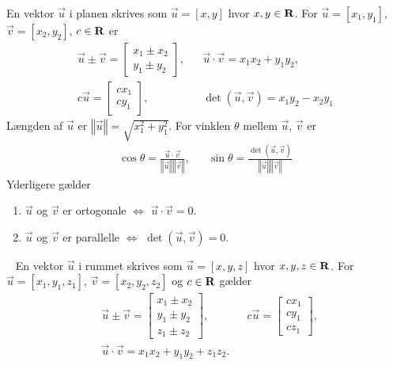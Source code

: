 En vektor $\vec{u}$ i planen skrives som $\vec{u}=[x,y]$ hvor $x,y\in \mathbf{R}$.
For $\vec{u}=[x_1,y_1]$, $\vec{v}=[x_2,y_2]$, $c\in \mathbf{R}$ er 
\begin{align*}
    \vec{u}\pm\vec{v}=\begin{bmatrix}
        x_1\pm x_2\\y_1\pm y_2
    \end{bmatrix}, &&\vec{u}\cdot\vec{v}=x_1x_2+y_1y_2 ,\\
    c\vec{u}=\begin{bmatrix*}
        cx_1\\cy_1
    \end{bmatrix*}, && \!\!\!\det(\vec{u},\vec{v})=x_1y_2-x_2y_1
\end{align*}
Længden af $\vec{u}$ er $\left\Vert \vec{u}\right\Vert=\sqrt{x_1^2+y_1^2}$.
For vinklen $\theta$ mellem $\vec{u}$, $\vec{v}$ er 
\begin{align*}
    \cos\theta=\frac{\vec{u}\cdot\vec{v}}{\left\Vert \vec{u}\right\Vert \left\Vert \vec{v}\right\Vert }, && \sin\theta=\frac{\det(\vec{u},\vec{v})}{\left\Vert \vec{u}\right\Vert \left\Vert \vec{v}\right\Vert}
\end{align*}
Yderligere gælder 
\begin{enumerate}
    \item $\vec{u}$ og $\vec{v}$ er ortogonale $\Leftrightarrow $ $\vec{u}\cdot\vec{v}=0$.
    \item $\vec{u}$ og $\vec{v}$ er parallelle $\Leftrightarrow$ $\det(\vec{u},\vec{v})=0$.
\end{enumerate}
\
En vektor $\vec{u}$ i rummet skrives som $\vec{u}=[x,y,z]$ hvor $x,y,z\in \mathbf{R}$.
\mysubsection{Regneregler}
For $\vec{u}=[x_1,y_1,z_1]$, $\vec{v}=[x_2,y_2,z_2]$ og $c\in \mathbf{R}$ gælder 
\begin{align*}
    &\vec{u}\pm\vec{v}=\begin{bmatrix}
        x_1\pm x_2\\y_1\pm y_2\\z_1\pm z_2
    \end{bmatrix}, && c\vec{u}=\begin{bmatrix*}
        cx_1\\cy_1\\c z_1
    \end{bmatrix*},\\
    &\vec{u}\cdot\vec{v}=x_1x_2+y_1y_2+z_1z_2. &&
\end{align*}
